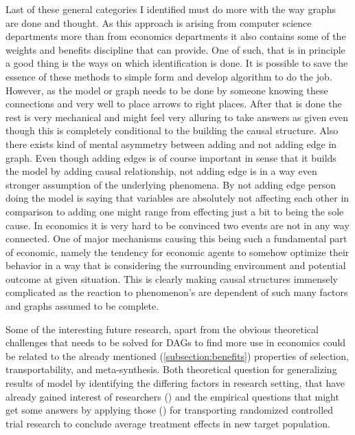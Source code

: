\documentclass[main=english,12pt,a4paper,pdftex,econ,utf8]{aaltothesis}
\begin{document}
Last of these general categories I identified must do more with the way graphs are done and thought. As this approach is arising from computer science departments more than from economics departments it also contains some of the weights and benefits discipline that can provide. One of such, that is in principle a good thing is the ways on which identification is done. It is possible to save the essence of these methods to simple form and develop algorithm to do the job. However, as the model or graph needs to be done by someone knowing these connections and very well to place arrows to right places. After that is done the rest is very mechanical and might feel very alluring to take answers as given even though this is completely conditional to the building the causal structure. Also there exists kind of mental asymmetry between adding and not adding edge in graph. Even though adding edges is of course important in sense that it builds the model by adding causal relationship, not adding edge is in a way even stronger assumption of the underlying phenomena. By not adding edge person doing the model is saying that variables are absolutely not affecting each other in comparison to adding one might range from effecting just a bit to being the sole cause. In economics it is very hard to be convinced two events are not in any way connected. One of major mechanisms causing this being such a fundamental part of economic, namely the tendency for economic agents to somehow optimize their behavior in a way that is considering the surrounding environment and potential outcome at given situation. This is clearly making causal structures immensely complicated as the reaction to phenomenon's are dependent of such many factors and graphs assumed to be complete.

Some of the interesting future research, apart from the obvious theoretical challenges that needs to be solved for DAGs to find more use in economics could be related to the already mentioned (\ref{subsection:benefits}) properties of selection, transportability, and meta-synthesis. Both theoretical question for generalizing results of model by identifying the differing factors in research setting, that have already gained interest of researchers (\cite{Cinelli2021}) and the empirical questions that might get some answers by applying those (\cite{Dahabreh2020}) for transporting randomized controlled trial research to conclude average treatment effects in new target population.
\end{document}
